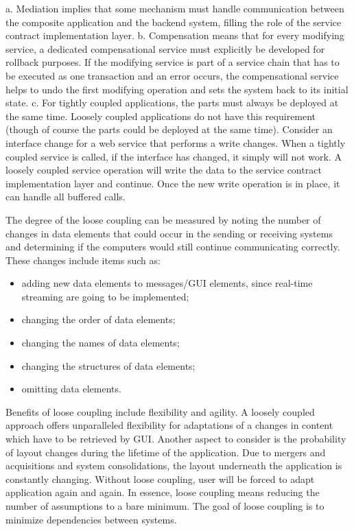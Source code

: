 \newline
a. Mediation implies that some mechanism must handle communication between the composite application and the backend system, filling the role of the service contract implementation layer.
\newline
b. Compensation means that for every modifying service, a dedicated compensational service must explicitly be developed for rollback purposes. If the modifying service is part of a service chain that has to be executed as one transaction and an error occurs, the compensational service helps to undo the first modifying operation and sets the system back to its initial state. 
\newline
c. For tightly coupled applications, the parts must always be deployed at the same time. Loosely coupled applications do not have this requirement (though of course the parts could be deployed at the same time). Consider an interface change for a web service that performs a write changes. When a tightly coupled service is called, if the interface has changed, it simply will not work. A loosely coupled service operation will write the data to the service contract implementation layer and continue. Once the new write operation is in place, it can handle all buffered calls. 

The degree of the loose coupling can be measured by noting the number of changes in data elements that could occur in the sending or receiving systems and determining if the computers would still continue communicating correctly\cite{firestone1984study,danneels2003tight}. These changes include items such as:
\begin{itemize}
\item adding new data elements to messages/GUI elements, since real-time streaming are going to be implemented;
\item changing the order of data elements;
\item changing the names of data elements;
\item changing the structures of data elements;
\item omitting data elements.
\end{itemize}

	Benefits of loose coupling include flexibility and agility. A loosely coupled approach offers unparalleled flexibility for adaptations of a changes in content which have to be retrieved by GUI. Another aspect to consider is the probability of layout changes during the lifetime of the application. Due to mergers and acquisitions and system consolidations, the layout underneath the application is constantly changing. Without loose coupling, user will be forced to adapt application again and again. In essence, loose coupling means reducing the number of assumptions to a bare minimum. The goal of loose coupling is to minimize dependencies between systems. 

